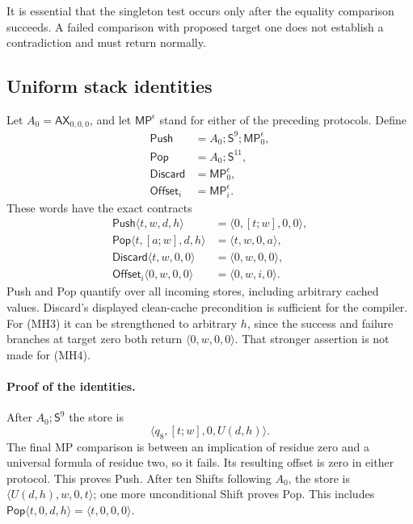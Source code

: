 It is essential that the singleton test occurs only after the equality
comparison succeeds. A failed comparison with proposed target one does
not establish a contradiction and must return normally.

\subsection{Uniform stack identities}

Let $A_0=\mathsf{AX}_{0,0,0}$, and let $\mathsf{MP}^{\epsilon}$ stand
for either of the preceding protocols. Define
\[
 \begin{aligned}
 \mathsf{Push}&=A_0;\mathsf S^9;\mathsf{MP}^{\epsilon}_0,\\
 \mathsf{Pop}&=A_0;\mathsf S^{11},\\
 \mathsf{Discard}&=\mathsf{MP}^{\epsilon}_0,\\
 \mathsf{Offset}_i&=\mathsf{MP}^{\epsilon}_i.
 \end{aligned}
 \tag{MH5}
\]
These words have the exact contracts
\[
 \begin{aligned}
 \mathsf{Push}\langle t,w,d,h\rangle
    &=\langle0,[t;w],0,0\rangle,\\
 \mathsf{Pop}\langle t,[a;w],d,h\rangle
    &=\langle t,w,0,a\rangle,\\
 \mathsf{Discard}\langle t,w,0,0\rangle
    &=\langle0,w,0,0\rangle,\\
 \mathsf{Offset}_i\langle0,w,0,0\rangle
    &=\langle0,w,i,0\rangle.
 \end{aligned}
 \tag{MH6}
\]
Push and Pop quantify over all incoming stores, including arbitrary
cached values. Discard's displayed clean-cache precondition is sufficient
for the compiler. For (MH3) it can be strengthened to arbitrary $h$,
since the success and failure branches at target zero both return
$\langle0,w,0,0\rangle$. That stronger assertion is not made for (MH4).

\paragraph{Proof of the identities.}
After $A_0;\mathsf S^9$ the store is
\[
    \langle q_8,[t;w],0,U(d,h)\rangle.
\]
The final MP comparison is between an implication of residue zero and
a universal formula of residue two, so it fails. Its resulting offset
is zero in either protocol. This proves Push. After ten Shifts following
$A_0$, the store is $\langle U(d,h),w,0,t\rangle$; one more unconditional
Shift proves Pop. This includes
$\mathsf{Pop}\langle t,0,d,h\rangle=\langle t,0,0,0\rangle$.

